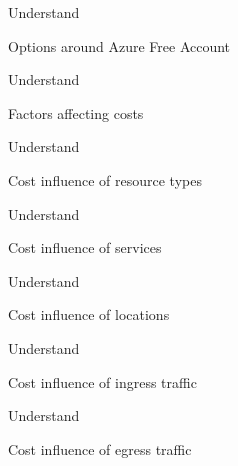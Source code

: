 \documentclass{scrartcl}
\newenvironment{flashcard}[2][]{%
    #1
    \vfill
    \centerline{\Large{#2}}
    \vfill
    \newpage
}
{\newpage}
\begin{document}
    \begin{flashcard}[Understand]{Options around Azure Free Account}

    \end{flashcard}

    \begin{flashcard}[Understand]{Factors affecting costs}

    \end{flashcard}

    \begin{flashcard}[Understand]{Cost influence of resource types}

    \end{flashcard}

    \begin{flashcard}[Understand]{Cost influence of services}

    \end{flashcard}

    \begin{flashcard}[Understand]{Cost influence of locations}

    \end{flashcard}

    \begin{flashcard}[Understand]{Cost influence of ingress traffic}

    \end{flashcard}

    \begin{flashcard}[Understand]{Cost influence of egress traffic}

    \end{flashcard}
\end{document}
